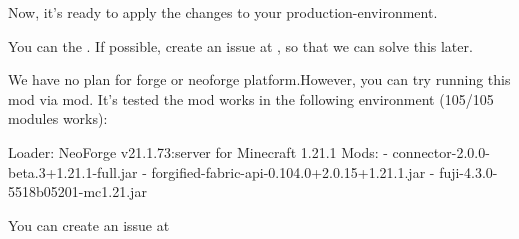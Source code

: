 Now, it's ready to apply the changes to your production-environment.


You can  the .
If possible, create an issue at \issueurl, so that we can solve this later.

We have no plan for forge or neoforge platform.However, you can try running this mod via  mod.
It's tested the mod works in the following environment (105/105 modules works):
\begin{shcode}
    Loader: NeoForge v21.1.73:server for Minecraft 1.21.1
    Mods:
    - connector-2.0.0-beta.3+1.21.1-full.jar
    - forgified-fabric-api-0.104.0+2.0.15+1.21.1.jar
    - fuji-4.3.0-5518b05201-mc1.21.jar
\end{shcode}

You can create an issue at \issueurl



